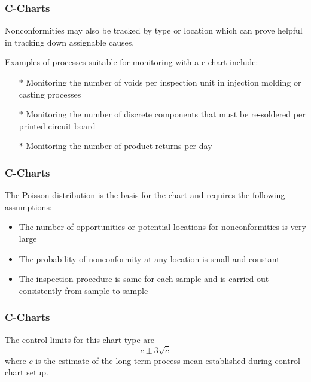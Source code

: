 \documentclass[Charts101.tex]{subfiles}
\begin{document}
\begin{frame}
\frametitle{C-Charts}
\Large
Nonconformities may also be tracked by type or location which can prove helpful in tracking down assignable causes.

Examples of processes suitable for monitoring with a c-chart include:
\begin{itemize}
\item[$\ast$] Monitoring the number of voids per inspection unit in injection molding or casting processes
\item[$\ast$] Monitoring the number of discrete components that must be re-soldered per printed circuit board
\item[$\ast$] Monitoring the number of product returns per day
\end{itemize}

\end{frame}
\begin{frame}
\frametitle{C-Charts}
\Large
The Poisson distribution is the basis for the chart and requires the following assumptions:
\begin{itemize}
\item 
The number of opportunities or potential locations for nonconformities is very large
\item The probability of nonconformity at any location is small and constant
\item The inspection procedure is same for each sample and is carried out consistently from sample to sample
\end{itemize}

\end{frame}
\begin{frame}
\frametitle{C-Charts}
\Large

The control limits for this chart type are \[ \bar{c} \pm 3\sqrt{\bar{c}}\] where $\bar{c}$ is the estimate of the long-term process mean established during control-chart setup.


\end{frame}
\end{document}
